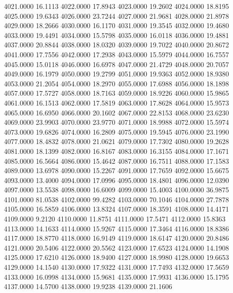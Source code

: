 4021.0000     16.1113
4022.0000     17.8943
4023.0000     19.2602
4024.0000     18.8195
4025.0000     19.6343
4026.0000     23.7244
4027.0000     21.9681
4028.0000     21.8978
4029.0000     18.2666
4030.0000     16.1170
4031.0000     19.3545
4032.0000     19.4680
4033.0000     19.4491
4034.0000     15.5798
4035.0000     16.0118
4036.0000     19.4881
4037.0000     20.8844
4038.0000     18.0320
4039.0000     19.7022
4040.0000     20.8672
4041.0000     17.7556
4042.0000     17.2938
4043.0000     15.5979
4044.0000     16.7557
4045.0000     15.0118
4046.0000     16.6978
4047.0000     21.4729
4048.0000     20.7057
4049.0000     16.1979
4050.0000     19.2799
4051.0000     19.9363
4052.0000     18.9380
4053.0000     21.2054
4054.0000     18.2970
4055.0000     17.6988
4056.0000     18.1898
4057.0000     17.5727
4058.0000     18.7163
4059.0000     18.9226
4060.0000     15.9865
4061.0000     16.1513
4062.0000     17.5819
4063.0000     17.8628
4064.0000     15.9573
4065.0000     16.6950
4066.0000     20.1602
4067.0000     22.8153
4068.0000     23.6230
4069.0000     23.9903
4070.0000     23.9770
4071.0000     18.9988
4072.0000     15.5974
4073.0000     19.6826
4074.0000     16.2809
4075.0000     19.5945
4076.0000     23.1990
4077.0000     18.4832
4078.0000     21.0621
4079.0000     17.7302
4080.0000     19.2628
4081.0000     18.1399
4082.0000     16.8167
4083.0000     16.3155
4084.0000     17.1671
4085.0000     16.5664
4086.0000     15.4642
4087.0000     16.7511
4088.0000     17.1583
4089.0000     13.6978
4090.0000     15.2267
4091.0000     17.7659
4092.0000     15.6675
4093.0000     13.4000
4094.0000     17.0996
4095.0000     18.4801
4096.0000     12.0390
4097.0000     13.5538
4098.0000     16.6009
4099.0000     15.4003
4100.0000     36.9875
4101.0000     81.0538
4102.0000     99.4282
4103.0000     70.1046
4104.0000     27.7878
4105.0000     16.5859
4106.0000     13.8324
4107.0000     18.3591
4108.0000     14.4171
4109.0000      9.2120
4110.0000     11.8751
4111.0000     17.5471
4112.0000     15.8363
4113.0000     14.1633
4114.0000     15.9267
4115.0000     17.3464
4116.0000     18.8386
4117.0000     18.8770
4118.0000     16.9149
4119.0000     18.6147
4120.0000     20.8486
4121.0000     20.5406
4122.0000     20.5562
4123.0000     17.6523
4124.0000     14.1908
4125.0000     17.6210
4126.0000     18.9400
4127.0000     18.9980
4128.0000     19.6653
4129.0000     14.1540
4130.0000     17.9322
4131.0000     17.7493
4132.0000     17.5659
4133.0000     16.0998
4134.0000     15.9681
4135.0000     17.9931
4136.0000     15.1795
4137.0000     14.5700
4138.0000     19.9238
4139.0000     21.1606
